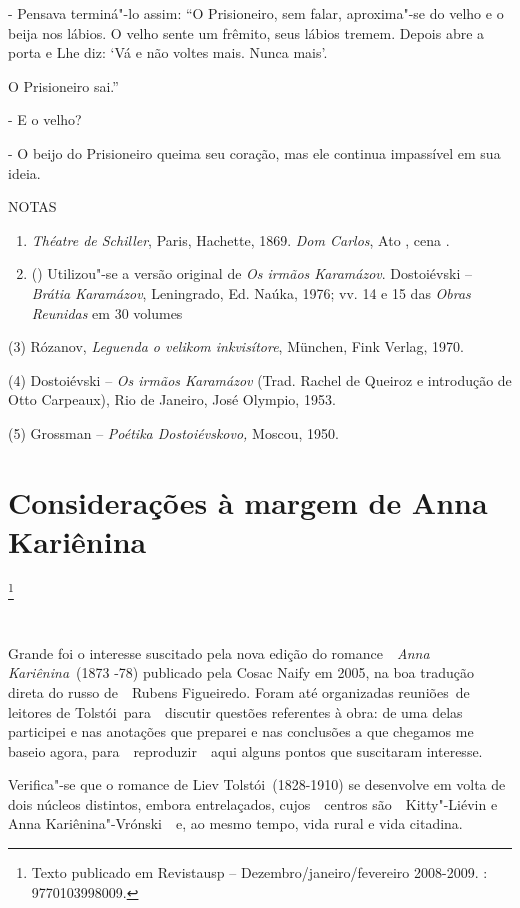 - Pensava terminá"-lo assim: ``O Prisioneiro, sem falar, aproxima"-se do
velho e o beija nos lábios. O velho sente um frêmito, seus lábios
tremem. Depois abre a porta e Lhe diz: `Vá e não voltes mais. Nunca
mais'.

O Prisioneiro sai.''

- E o velho?

- O beijo do Prisioneiro queima seu coração, mas ele continua impassível
em sua ideia.

NOTAS

\begin{enumerate}
\def\labelenumi{(\arabic{enumi})}
\item
  \emph{Théatre de Schiller}, Paris, Hachette, 1869. \emph{Dom Carlos},
  Ato , cena .
\item
  () Utilizou"-se a versão original de \emph{Os irmãos Karamázov}. 
  Dostoiévski -- \emph{Brátia Karamázov}, Leningrado, Ed. Naúka, 1976;
  vv. 14 e 15 das \emph{Obras Reunidas} em 30 volumes
\end{enumerate}

(3)  Rózanov, \emph{Leguenda o velikom inkvisítore}, München, Fink
Verlag, 1970.

(4)  Dostoiévski -- \emph{Os irmãos Karamázov} (Trad. Rachel de
Queiroz e introdução de Otto  Carpeaux), Rio de Janeiro, José Olympio,
1953.

(5)  Grossman -- \emph{Poétika Dostoiévskovo,} Moscou, 1950.

\chapter{Considerações à margem de Anna Kariênina}\footnote{Texto
  publicado em Revistausp -- Dezembro/janeiro/fevereiro 2008-2009. :
  9770103998009.}

~

Grande foi o interesse suscitado pela nova edição do romance~~\emph{Anna
Kariênina}~(1873 -78) publicado pela Cosac Naify em 2005, na boa
tradução direta do russo de~~Rubens Figueiredo. Foram até organizadas
reuniões~de leitores de Tolstói~para~~discutir questões referentes à
obra: de uma delas participei e nas anotações que preparei e nas
conclusões a que chegamos me baseio agora, para~~reproduzir~~aqui alguns
pontos que suscitaram interesse.

Verifica"-se que o romance de Liev Tolstói~(1828-1910) se desenvolve em
volta de dois núcleos distintos, embora entrelaçados, cujos~~centros
são~~Kitty"-Liévin e Anna Kariênina"-Vrónski~~e, ao mesmo tempo, vida
rural e vida citadina.

